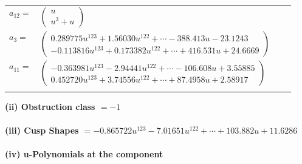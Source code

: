 \documentclass[1p]{elsarticle_modified}
\theoremstyle{definition}
\begin{document}
\begin{tabular}{m{7pt} m{180pt} m{7pt} m{180pt} }
\flushright $a_{12}=$&$\begin{pmatrix}u\\u^3+u\end{pmatrix}$ \\
\flushright $a_{3}=$&$\begin{pmatrix}0.289775 u^{123}+1.56030 u^{122}+\cdots-388.413 u-23.1243\\-0.113816 u^{123}+0.173382 u^{122}+\cdots+416.531 u+24.6669\end{pmatrix}$ \\
\flushright $a_{11}=$&$\begin{pmatrix}-0.363981 u^{123}-2.94441 u^{122}+\cdots-106.608 u+3.55885\\0.452720 u^{123}+3.74556 u^{122}+\cdots+87.4958 u+2.58917\end{pmatrix}$\\&\end{tabular}
\flushleft \textbf{(ii) Obstruction class $= -1$}\\~\\
\flushleft \textbf{(iii) Cusp Shapes $= -0.865722 u^{123}-7.01651 u^{122}+\cdots+103.882 u+11.6286$}\\~\\
\newpage\renewcommand{\arraystretch}{1}
\flushleft \textbf{(iv) u-Polynomials at the component}\newline \\
\end{document}
